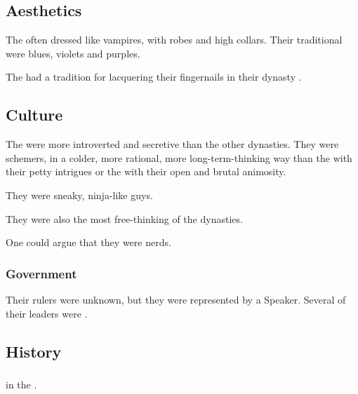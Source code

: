 \subsection{Aesthetics}

The \TiphredSerah{} often dressed like vampires, with robes and high collars. 
Their traditional \colours were blues, violets and purples.

The \TiphredSerah{} had a tradition for lacquering their fingernails in their dynasty \colours. 









\subsection{Culture}
The \TiphredSerah{} were more introverted and secretive than the other dynasties. 
They were schemers, in a colder, more rational, more long-term-thinking way than the \CiriathSepher{} with their petty intrigues or the \Mystraacht{} with their open and brutal animosity. 

They were sneaky, ninja-like guys. 

They were also the most free-thinking of the dynasties. 

One could argue that they were nerds. 





\subsubsection{Government}
Their rulers were unknown, but they were represented by a Speaker. 
Several of their leaders were \resviel. 









\subsection{History}





\subsubsection{\ResphanWars}
\TiphredSerah {} in the \resphanwars. 





